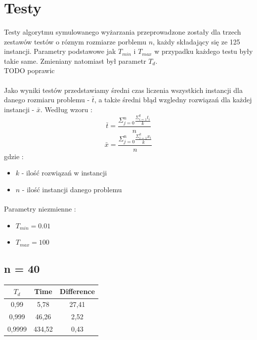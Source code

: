 \documentclass[wide,a4paper,titlepage,12pt] {article}
\begin{document}
\section{Testy}
\paragraph{}
Testy algorytmu symulowanego wyżarzania przeprowadzone zostały dla trzech zestawów testów o róznym rozmiarze porblemu $n$, każdy składający się ze 125 instancji. Parametry podstawowe jak $T_{min}$ i $T_{max}$ w przypadku każdego testu były takie same. Zmieniany natomiast był parametr $T_{d}$.
\\TODO poprawic
\paragraph{}
Jako wyniki testów przedstawiamy średni czas liczenia wszystkich instancji dla danego rozmiaru problemu - $\bar{t}$, a także średni błąd wzgledny  rozwiązań dla każdej instancji - $\bar{x}$. Według wzoru : \\
\begin{equation}
	\bar{t} = \frac{\Sigma_{j=0}^{n}\frac{\Sigma_{i=1}^{k}t_{i}}{k}}{n}
\end{equation}
\begin{equation}
	\bar{x} = \frac{\Sigma_{j=0}^{n}\frac{\Sigma_{i=1}^{k}x_{i}}{k}}{n}
\end{equation}
gdzie : \\
\begin{itemize}
  \item $k$ - ilość rozwiązań w instancji
  \item $n$ - ilość instancji danego problemu
\end{itemize}
\paragraph{}
Parametry niezmienne : 
\begin{itemize}
  \item $T_{min} = 0.01$
  \item $T_{max} = 100$
\end{itemize}
\newpage
\subsection{n = 40}
\begin{center}
    \begin{tabular}{|c|c|c|}
      \hline
       $T_{d}$ & Time & Difference \\ \hline
       0,99 & 5,78 & 27,41 \\ \hline
       0,999 & 46,26 & 2,52 \\ \hline
       0,9999 & 434,52 & 0,43 \\ \hline
  \end{tabular}
\end{center}
\end{document}
